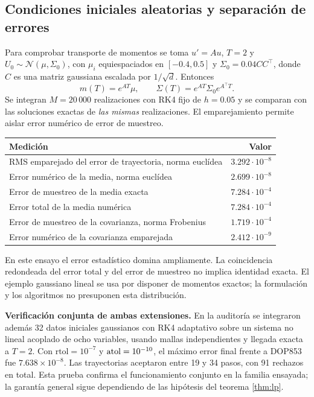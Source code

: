 \documentclass[11pt,a4paper]{article}
\theoremstyle{definition}\newtheorem{definition}[theorem]{Definición}
\theoremstyle{remark}\newtheorem{remark}[theorem]{Observación}
\newcommand{\rtol}{\mathrm{rtol}}
\begin{document}
\subsection{Condiciones iniciales aleatorias y separación de errores}
Para comprobar transporte de momentos se toma $u'=Au$, $T=2$ y
$U_0\sim\mathcal N(\mu,\Sigma_0)$, con $\mu_i$ equiespaciados en
$[-0.4,0.5]$ y $\Sigma_0=0.04CC^\top$, donde $C$ es una matriz gaussiana
escalada por $1/\sqrt d$. Entonces
\[
m(T)=e^{AT}\mu,\qquad\Sigma(T)=e^{AT}\Sigma_0e^{A^\top T}.
\]
Se integran $M=20\,000$ realizaciones con RK4 fijo de $h=0.05$ y se
comparan con las soluciones exactas de \emph{las mismas} realizaciones.
El emparejamiento permite aislar error numérico de error de muestreo.
\begin{center}\small
\begin{tabularx}{\linewidth}{@{}Xr@{}}\toprule
Medición & Valor\\\midrule
RMS emparejado del error de trayectoria, norma euclídea & $3.292\cdot10^{-8}$\\
Error numérico de la media, norma euclídea & $2.699\cdot10^{-8}$\\
Error de muestreo de la media exacta & $7.284\cdot10^{-4}$\\
Error total de la media numérica & $7.284\cdot10^{-4}$\\
Error de muestreo de la covarianza, norma Frobenius & $1.719\cdot10^{-4}$\\
Error numérico de la covarianza emparejada & $2.412\cdot10^{-9}$\\\bottomrule
\end{tabularx}\end{center}
En este ensayo el error estadístico domina ampliamente. La coincidencia
redondeada del error total y del error de muestreo no implica identidad
exacta. El ejemplo gaussiano lineal se usa por disponer de momentos
exactos; la formulación y los algoritmos no presuponen esta distribución.

\textbf{Verificación conjunta de ambas extensiones.} En la auditoría se
integraron además 32 datos iniciales gaussianos con RK4 adaptativo sobre un
sistema no lineal acoplado de ocho variables, usando mallas independientes
y llegada exacta a $T=2$. Con $\rtol=10^{-7}$ y $\mathrm{atol}=10^{-10}$, el máximo
error final frente a DOP853 fue $7.638\times10^{-8}$. Las trayectorias
aceptaron entre 19 y 34 pasos, con 91 rechazos en total. Esta prueba confirma
el funcionamiento conjunto en la familia ensayada; la garantía general
sigue dependiendo de las hipótesis del teorema \ref{thm:lp}.
\end{document}
